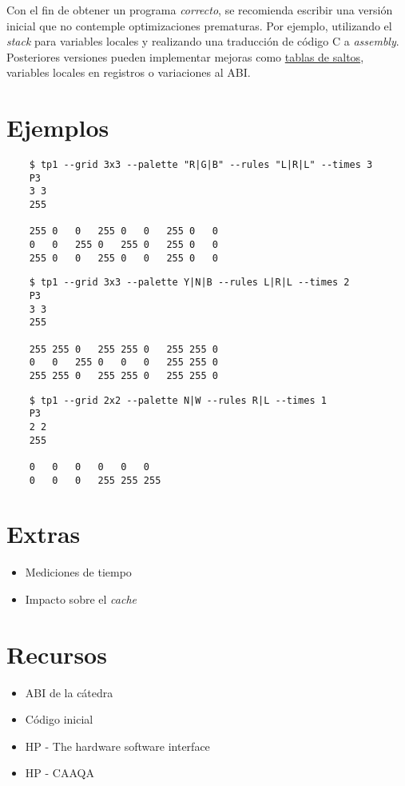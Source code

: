 \documentclass{article}
\begin{document}
Con el fin de obtener un programa \textit{correcto}, se recomienda escribir una versión inicial que no contemple
optimizaciones prematuras. Por ejemplo, utilizando el \textit{stack} para variables locales y realizando una traducción
de código C a \textit{assembly}. Posteriores versiones pueden implementar mejoras como \underline{tablas de saltos},
variables locales en registros o variaciones al ABI.

\section{Ejemplos}

    \begin{verbatim}
    $ tp1 --grid 3x3 --palette "R|G|B" --rules "L|R|L" --times 3
    P3
    3 3
    255

    255 0   0   255 0   0   255 0   0
    0   0   255 0   255 0   255 0   0 
    255 0   0   255 0   0   255 0   0
    \end{verbatim}

    \begin{verbatim}
    $ tp1 --grid 3x3 --palette Y|N|B --rules L|R|L --times 2
    P3
    3 3
    255

    255 255 0   255 255 0   255 255 0
    0   0   255 0   0   0   255 255 0
    255 255 0   255 255 0   255 255 0
    \end{verbatim}

    \begin{verbatim}
    $ tp1 --grid 2x2 --palette N|W --rules R|L --times 1
    P3
    2 2
    255

    0   0   0   0   0   0 
    0   0   0   255 255 255
    \end{verbatim}

\section{Extras}
\begin{itemize}
\item Mediciones de tiempo
\item Impacto sobre el \textit{cache}
\end{itemize}

\section{Recursos}

\begin{itemize}
\item ABI de la cátedra
\item Código inicial
\item HP - The hardware software interface
\item HP - CAAQA
\end{itemize}
\end{document}
